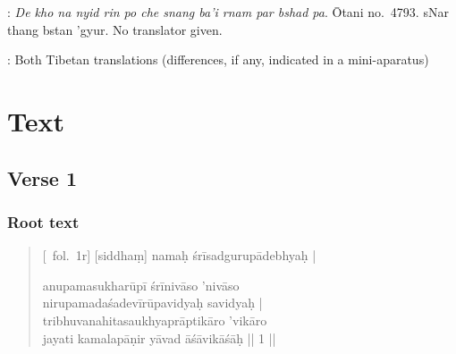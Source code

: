 \documentclass[12pt]{article}
\newcommand{\emdash} {\hspace{0em}—\hspace{0em}}
\begin{document}
\noindent \TVB : \emph{De kho na nyid rin po che snang ba'i rnam par bshad pa}. Ōtani no.\ 4793. sNar thang bstan 'gyur. No translator given.

\noindent \TIB : Both Tibetan translations (differences, if any, indicated in a mini-aparatus)

\section{Text}
\subsection{Verse 1}
\subsubsection{Root text}
\begin{quote}
	[\MS\ fol.\ 1r] [siddhaṃ]\footnoteB{
		[siddhaṃ]] \MS ; oṁ \EDD
	} namaḥ śrīsadgurupādebhyaḥ |
	

	anupamasukharūpī śrīnivāso 'nivāso \\
	nirupamadaśadevīrūpavidyaḥ\footnoteB{
		nirupama°] \EDD\ ; nirūpama° \MS
	} savidyaḥ |\\
	tribhuvanahitasaukhyaprāptikāro 'vikāro \\
	jayati kamalapāṇir yāvad āśāvikāśāḥ\footnoteB{
		āśāvikāśāḥ] \corr ; āśāvikāsāḥ \MS\ \EDD
	} || 1 ||
	
% 	
\end{quote}
\end{document}
